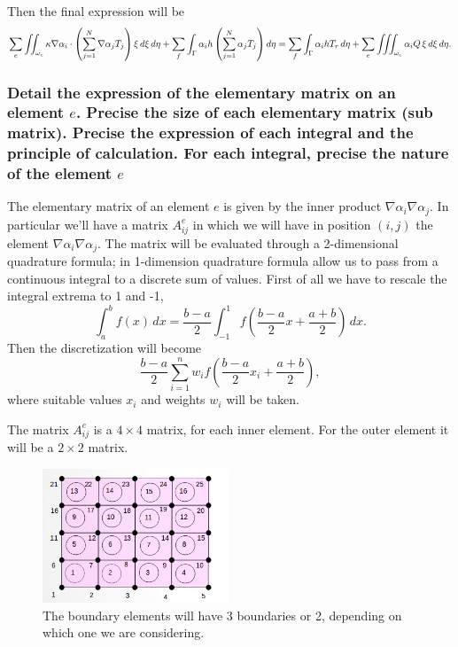 Then the final expression will be
\begin{align*}
\sum_e\iint_{\omega_e}\kappa\nabla\alpha_i\cdot\left(\sum_{j=1}^{N}\nabla\alpha_jT_j \right) \xi\mathop{}\!d\xi\mathop{}\!d\eta +\sum_f\int_{\Gamma}\alpha_ih\left(\sum_{j=1}^{N}\alpha_jT_j\right)\mathop{}\!d \eta=
\sum_f\int_{\Gamma}\alpha_ihT_r\mathop{}\!d \eta+\sum_e\iiint_{\omega_e}\alpha_iQ\,\xi\mathop{}\!d\xi\mathop{}\!d\eta.
\end{align*}


\subsubsection{Detail the expression of the elementary matrix on an element $ e $. Precise the size of each elementary matrix (sub matrix). Precise the expression of each integral and the principle of calculation. For each integral, precise the nature of the element $ e $} 

The elementary matrix of an element $ e $ is given by the inner product $ \nabla\alpha_i\nabla\alpha_j $. In particular we'll have a matrix $ A_{ij}^e $ in which we will have in position $ (i,j) $ the element $ \nabla\alpha_i\nabla\alpha_j $. 
The matrix will be evaluated through a 2-dimensional quadrature formula; in 1-dimension quadrature formula allow us to pass from a continuous integral to a discrete sum of values. First of all we have to rescale the integral extrema to 1 and -1,
\[\int_{a}^{b}f(x)\,dx = \frac{b-a}{2}\int_{-1}^{1}f\left(\frac {b-a}{2}x+ \frac{a+b}{2}\right)\, dx. \]
Then the discretization will become
\[ \frac{b-a}{2} \sum_{i=1}^{n}w_{i}f\left(\frac {b-a}{2}x_{i}+ \frac{a+b}{2}\right),\]
where suitable values $ x_i $ and weights $ w_i $ will be taken.

The matrix $ A_{ij}^e $ is a $ 4\times4 $ matrix, for each inner element. For the outer element it will be a $ 2\times2 $ matrix. 
\begin{figure}
	\centering
	\includegraphics[height=4cm]{Images/mesh.png}
	\caption{The boundary elements will have 3 boundaries or 2, depending on which one we are considering.}
\end{figure}

